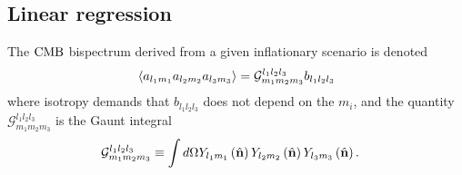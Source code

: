     \subsection{Linear regression}
    The $\text{CMB}$ bispectrum derived from a given inflationary scenario is denoted
    \begin{align}
        \left<a_{l_1m_1}a_{l_2m_2}a_{l_3m_3}\right> = \mathcal{G}^{l_1l_2l_3}_{m_1m_2m_3}b_{l_1l_2l_3}
    \end{align}
    where isotropy demands that $b_{l_1l_2l_3}$ does not depend on the $m_i$,
    and the quantity $\mathcal{G}^{l_1l_2l_3}_{m_1m_2m_3}$ is the Gaunt integral
    \begin{align}
        \mathcal{G}^{l_1l_2l_3}_{m_1m_2m_3} &\equiv \int d\Omega Y_{l_1m_1}\nhatbrkt Y_{l_2m_2}\nhatbrkt Y_{l_3m_3}\nhatbrkt. %
    \end{align}


